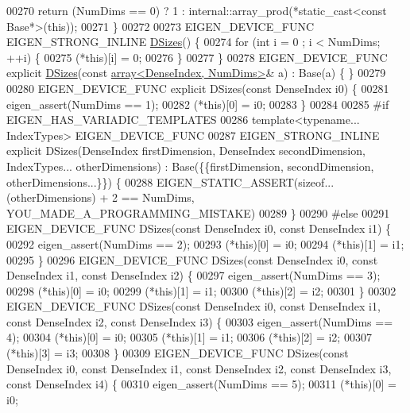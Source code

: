\begin{DoxyCode}
00270     \textcolor{keywordflow}{return} (NumDims == 0) ? 1 : internal::array\_prod(*static\_cast<const Base*>(\textcolor{keyword}{this}));
00271   \}
00272 
00273   EIGEN\_DEVICE\_FUNC EIGEN\_STRONG\_INLINE \hyperlink{struct_eigen_1_1_d_sizes}{DSizes}() \{
00274     \textcolor{keywordflow}{for} (\textcolor{keywordtype}{int} i = 0 ; i < NumDims; ++i) \{
00275       (*this)[i] = 0;
00276     \}
00277   \}
00278   EIGEN\_DEVICE\_FUNC \textcolor{keyword}{explicit} \hyperlink{struct_eigen_1_1_d_sizes}{DSizes}(\textcolor{keyword}{const} \hyperlink{class_eigen_1_1array}{array<DenseIndex, NumDims>}& a) : 
      Base(a) \{ \}
00279 
00280   EIGEN\_DEVICE\_FUNC \textcolor{keyword}{explicit} DSizes(\textcolor{keyword}{const} DenseIndex i0) \{
00281     eigen\_assert(NumDims == 1);
00282     (*this)[0] = i0;
00283   \}
00284 
00285 \textcolor{preprocessor}{#if EIGEN\_HAS\_VARIADIC\_TEMPLATES}
00286   \textcolor{keyword}{template}<\textcolor{keyword}{typename}... IndexTypes> EIGEN\_DEVICE\_FUNC
00287   EIGEN\_STRONG\_INLINE \textcolor{keyword}{explicit} DSizes(DenseIndex firstDimension, DenseIndex secondDimension, IndexTypes... 
      otherDimensions) : Base(\{\{firstDimension, secondDimension, otherDimensions...\}\}) \{
00288     EIGEN\_STATIC\_ASSERT(\textcolor{keyword}{sizeof}...(otherDimensions) + 2 == NumDims, YOU\_MADE\_A\_PROGRAMMING\_MISTAKE)
00289   \}
00290 \textcolor{preprocessor}{#else}
00291   EIGEN\_DEVICE\_FUNC DSizes(\textcolor{keyword}{const} DenseIndex i0, \textcolor{keyword}{const} DenseIndex i1) \{
00292     eigen\_assert(NumDims == 2);
00293     (*this)[0] = i0;
00294     (*this)[1] = i1;
00295   \}
00296   EIGEN\_DEVICE\_FUNC DSizes(\textcolor{keyword}{const} DenseIndex i0, \textcolor{keyword}{const} DenseIndex i1, \textcolor{keyword}{const} DenseIndex i2) \{
00297     eigen\_assert(NumDims == 3);
00298     (*this)[0] = i0;
00299     (*this)[1] = i1;
00300     (*this)[2] = i2;
00301   \}
00302   EIGEN\_DEVICE\_FUNC DSizes(\textcolor{keyword}{const} DenseIndex i0, \textcolor{keyword}{const} DenseIndex i1, \textcolor{keyword}{const} DenseIndex i2, \textcolor{keyword}{const} DenseIndex 
      i3) \{
00303     eigen\_assert(NumDims == 4);
00304     (*this)[0] = i0;
00305     (*this)[1] = i1;
00306     (*this)[2] = i2;
00307     (*this)[3] = i3;
00308   \}
00309   EIGEN\_DEVICE\_FUNC DSizes(\textcolor{keyword}{const} DenseIndex i0, \textcolor{keyword}{const} DenseIndex i1, \textcolor{keyword}{const} DenseIndex i2, \textcolor{keyword}{const} DenseIndex 
      i3, \textcolor{keyword}{const} DenseIndex i4) \{
00310     eigen\_assert(NumDims == 5);
00311     (*this)[0] = i0;

\end{DoxyCode}
